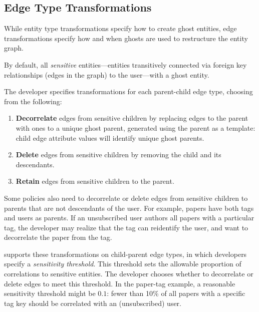 \subsection{Edge Type Transformations}
\label{design:edgepol}
While entity type transformations specify how to create ghost entities, edge transformations 
specify how and when ghosts are used to restructure the entity graph.

By default, all \emph{sensitive} entities---entities transitively connected via foreign key
relationships (edges in the graph) to the user---with a ghost entity.

The developer specifies transformations for each parent-child edge type, choosing from the following:
\begin{enumerate}
    \item \textbf{Decorrelate} edges from sensitive children by replacing edges to the parent with
        ones to a unique ghost parent, generated using the parent as a template:
        child edge attribute values will identify unique ghost parents.
    \item \textbf{Delete} edges from sensitive children by removing the child and its descendants.
    \item \textbf{Retain} edges from sensitive children to the parent.
\end{enumerate}

Some policies also need to decorrelate or delete edges from sensitive children to parents that are
not descendants of the user. For example, papers have both tags and users as parents. If an
unsubscribed user authors all papers with a particular tag, the developer may realize that the tag
can reidentify the user, and want to decorrelate the paper from the tag.

\sys supports these transformations on child-parent edge types, in which developers specify  a
\emph{sensitivity threshold}. This threshold sets the allowable proportion of correlations to
sensitive entities. The developer chooses whether to decorrelate or delete edges to meet this
threshold. In the paper-tag example, a reasonable sensitivity threshold might be $0.1$: fewer than
10\% of all papers with a specific tag key should be correlated with an (unsubscribed) user.

